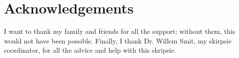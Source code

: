 \chapter*{Acknowledgements}
\makeatletter{}\makeatother

I want to thank my family and friends for all the support; without them, this would not have been possible. Finally, I thank Dr. Willem Smit, my skirpsie coordinator, for all the advice and help with this skripsie.
